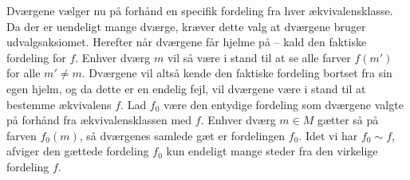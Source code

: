 \begin{minipage}[t]{100mm}
Dværgene vælger nu på forhånd en specifik fordeling fra hver ækvivalensklasse. Da der er uendeligt mange dværge, kræver dette valg at dværgene bruger udvalgsaksiomet.
Herefter når dværgene får hjelme på -- kald den faktiske fordeling for $f$. Enhver dværg $m$ vil så være i stand til at se alle farver $f(m')$ for alle $m'\neq m$. Dværgene vil altså kende den faktiske fordeling bortset fra sin egen hjelm, og da dette er en endelig fejl, vil dværgene være i stand til at bestemme ækvivalens $f$. Lad $f_0$ være den entydige fordeling som dværgene valgte på forhånd fra ækvivalensklassen med $f$. Enhver dværg $m\in M$ gætter så på farven $f_0(m)$, så dværgenes samlede gæt er fordelingen $f_0$. Idet vi har $f_0\sim f$, afviger den gættede fordeling $f_0$ kun endeligt mange steder fra den virkelige fordeling $f$.

\end{minipage}
